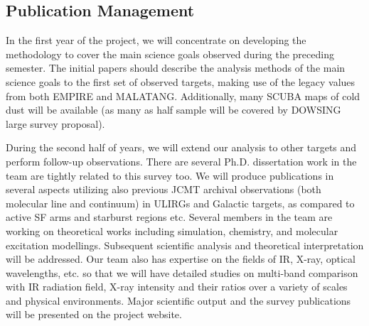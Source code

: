 \documentclass[legal,11pt]{article}
\begin{document}
\subsection{Publication Management} 

In the first year of the project, we will
concentrate on developing the methodology to cover the main science goals
observed during the preceding semester. The initial papers should describe the
analysis methods of the main science goals to the first set of observed
targets, making use of the legacy values from both EMPIRE and MALATANG.   
Additionally, many SCUBA maps of cold dust will be available (as many as half
sample will be covered by DOWSING large survey proposal).

During the second half of years, we will extend our
analysis to other targets and perform follow-up observations. There are several
Ph.D. dissertation work in the team are tightly related to this survey too. We
will produce publications in several aspects utilizing also previous JCMT
archival observations (both molecular line and continuum) in ULIRGs and
Galactic targets, as compared to active SF arms and starburst regions etc.
Several members in the team are working on theoretical works including
simulation, chemistry, and molecular excitation modellings.  Subsequent
scientific analysis and theoretical interpretation will be addressed. Our team
also has expertise on the fields of IR, X-ray, optical wavelengths, etc.  so
that we will have detailed studies on multi-band comparison with IR radiation
field, X-ray intensity and their ratios over a variety of scales and physical
environments. Major scientific output and the survey publications will be
presented on the project website. 



\setlength{\bibsep}{0pt}
\begin{multicols}{2}

{\footnotesize
{}
}
\end{multicols}






\end{document}
